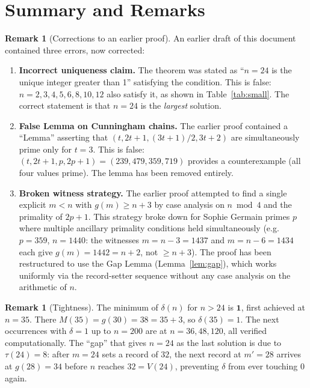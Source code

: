 \documentclass[12pt]{article}
\theoremstyle{plain}
\theoremstyle{definition}
\newtheorem{remark}[theorem]{Remark}
\begin{document}
\section{Summary and Remarks}

\begin{remark}[Corrections to an earlier proof]
  An earlier draft of this document contained three errors, now corrected:
  \begin{enumerate}[label=(\arabic*)]
    \item \textbf{Incorrect uniqueness claim.} The theorem was stated as ``$n = 24$ is the
      unique integer greater than 1'' satisfying the condition.  This is false: $n = 2, 3, 4, 5, 6, 8, 10, 12$
      also satisfy it, as shown in Table~\ref{tab:small}.  The correct statement is that
      $n = 24$ is the \emph{largest} solution.
    \item \textbf{False Lemma on Cunningham chains.} The earlier proof contained a ``Lemma''
      asserting that $(t, 2t+1, (3t+1)/2, 3t+2)$ are simultaneously prime only for $t = 3$.
      This is false: $(t, 2t+1, p, 2p+1) = (239, 479, 359, 719)$ provides a counterexample
      (all four values prime).  The lemma has been removed entirely.
    \item \textbf{Broken witness strategy.} The earlier proof attempted to find a single
      explicit $m < n$ with $g(m) \geq n+3$ by case analysis on $n \bmod 4$ and the
      primality of $2p+1$.  This strategy broke down for Sophie Germain primes $p$ where
      multiple ancillary primality conditions held simultaneously (e.g.\ $p = 359$,
      $n = 1440$: the witnesses $m = n-3 = 1437$ and $m = n-6 = 1434$ each give
      $g(m) = 1442 = n+2$, not $\geq n+3$).  The proof has been restructured to use the
      Gap Lemma (Lemma~\ref{lem:gap}), which works uniformly via the record-setter sequence
      without any case analysis on the arithmetic of $n$.
  \end{enumerate}
\end{remark}

\begin{remark}[Tightness]
  The minimum of $\delta(n)$ for $n > 24$ is $\mathbf{1}$, first achieved at $n = 35$.
  There $M(35) = g(30) = 38 = 35 + 3$, so $\delta(35) = 1$.  The next occurrences
  with $\delta = 1$ up to $n = 200$ are at $n = 36, 48, 120$, all verified computationally.
  The ``gap'' that gives $n = 24$ as the last solution is due to $\tau(24) = 8$: after
  $m = 24$ sets a record of $32$, the next record at $m' = 28$ arrives at $g(28) = 34$
  before $n$ reaches $32 = V(24)$, preventing $\delta$ from ever touching 0 again.
\end{remark}
\end{document}
